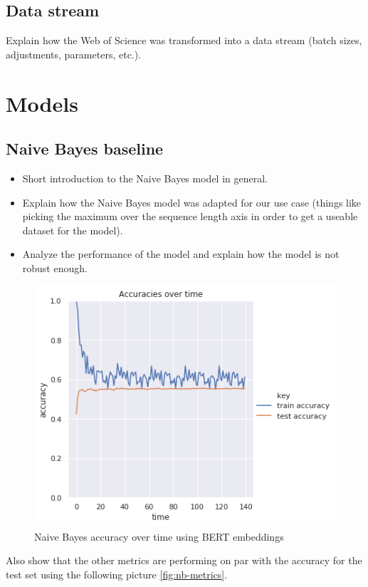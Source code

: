 \documentclass[12pt]{report}
\begin{document}
\subsection{Data stream}

Explain how the Web of Science was transformed into a data stream (batch sizes, adjustments, parameters, etc.).

\section{Models}

\subsection{Naive Bayes baseline}

\begin{itemize}
    \item Short introduction to the Naive Bayes model in general.
    \item Explain how the Naive Bayes model was adapted for our use case (things like picking the maximum over the sequence length axis in order to get a useable dataset for the model).
    \item Analyze the performance of the model and explain how the model is not robust enough.
\end{itemize}

\begin{figure}[ht!]
\centering
\includegraphics[width=0.8\linewidth]{assets/framework/nb_BERT_accuracy_holdout.png}
\caption{Naive Bayes accuracy over time using BERT embeddings}
\label{fig:nb-acc}
\end{figure}

Also show that the other metrics are performing on par with the accuracy for the test set using the following picture \ref{fig:nb-metrics}.
\end{document}
